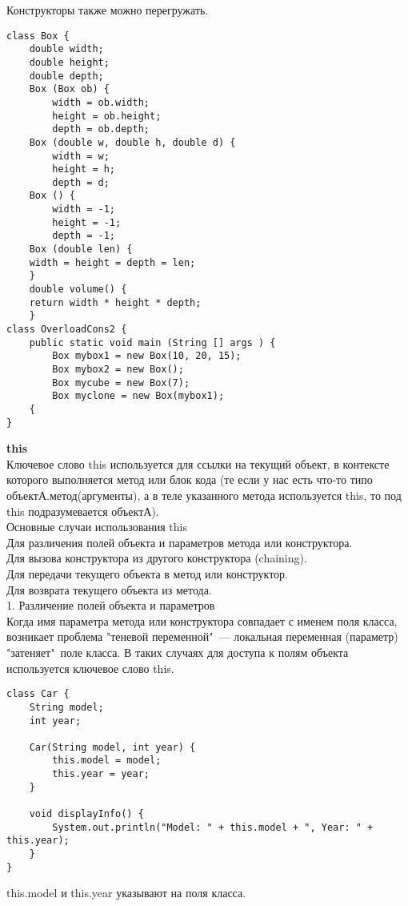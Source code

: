 Конструкторы также можно перегружать. \\
\begin{lstlisting}
class Box {
    double width;
    double height;
    double depth;
    Box (Box ob) { 
        width = ob.width;
        height = ob.height;
        depth = ob.depth;
    Box (double w, double h, double d) {
        width = w;
        height = h;
        depth = d;
    Box () {
        width = -1;
        height = -1;
        depth = -1;
    Box (double len) { 
    width = height = depth = len;
    }
    double volume() {
    return width * height * depth;
    }
class OverloadCons2 {
    public static void main (String [] args ) {
        Box mybox1 = new Box(10, 20, 15);
        Box mybox2 = new Box();
        Box mycube = new Box(7);
        Box myclone = new Box(mybox1); 
    {
}
\end{lstlisting}
\textbf{this} \\
Ключевое слово this используется для ссылки на текущий объект, в контексте которого выполняется метод или блок кода (те если у нас есть что-то типо объектА.метод(аргументы), а в теле указанного метода используется this, то под this подразумевается объектА). \\
Основные случаи использования this \\
Для различения полей объекта и параметров метода или конструктора. \\
Для вызова конструктора из другого конструктора (chaining). \\
Для передачи текущего объекта в метод или конструктор. \\
Для возврата текущего объекта из метода. \\
1. Различение полей объекта и параметров \\
Когда имя параметра метода или конструктора совпадает с именем поля класса, возникает проблема "теневой переменной"\, — локальная переменная (параметр) "затеняет" \,поле класса. В таких случаях для доступа к полям объекта используется ключевое слово this. \\
\begin{lstlisting}
class Car {
    String model;
    int year;
    
    Car(String model, int year) {
        this.model = model;
        this.year = year;
    }
    
    void displayInfo() {
        System.out.println("Model: " + this.model + ", Year: " + this.year);
    }
}
\end{lstlisting}
this.model и this.year указывают на поля класса.

